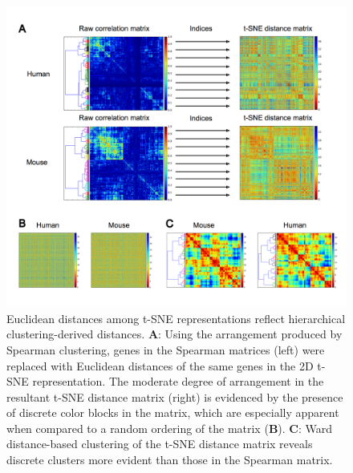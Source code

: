 \documentclass[12pt,oneside,onecolumn,a4paper]{article}
\begin{document}
\begin{figure}[H]
\begin{center}
\includegraphics[width=\columnwidth]{figures/correlations}
\caption{Euclidean distances among t-SNE representations reflect hierarchical clustering-derived distances. \textbf{A}: Using the arrangement produced by Spearman clustering, genes in the Spearman matrices (left) were replaced with Euclidean distances of the same genes in the 2D t-SNE representation. The moderate degree of arrangement in the resultant t-SNE distance matrix (right) is evidenced by the presence of discrete color blocks in the matrix, which are especially apparent when compared to a random ordering of the matrix (\textbf{B}). \textbf{C}: Ward distance-based clustering of the t-SNE distance matrix reveals discrete clusters more evident than those in the Spearman matrix. \label{fig:new_matrix}%
}
\end{center}
\end{figure}
\end{document}
